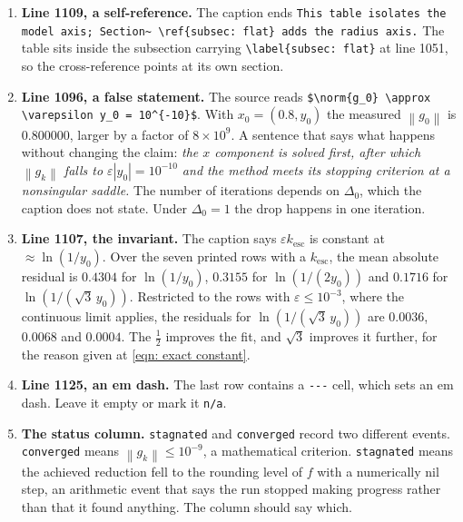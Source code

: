 \documentclass[11pt,a4paper]{article}
\providecommand{\abs}[1]{\left \vert #1 \right \vert}
\providecommand{\norm}[1]{\left \lVert #1 \right \rVert}
\theoremstyle{definition}
\theoremstyle{remark}
\begin{document}
\begin{enumerate}[leftmargin=2em]
  \item \textbf{Line 1109, a self-reference.} The caption ends
        \texttt{This table isolates the model axis; Section\textasciitilde
        \textbackslash ref\{subsec: flat\} adds the radius axis.} The table sits
        inside the subsection carrying \texttt{\textbackslash label\{subsec:
        flat\}} at line 1051, so the cross-reference points at its own section.

  \item \textbf{Line 1096, a false statement.} The source reads
        \texttt{\$\textbackslash norm\{g\_0\} \textbackslash approx
        \textbackslash varepsilon y\_0 = 10\^{}\{-10\}\$}. With
        $x_0 = (0.8, y_0)$ the measured $\norm{g_0}$ is $0.800000$, larger by a
        factor of $8\times10^{9}$. A sentence that says what happens without
        changing the claim: \emph{the $x$ component is solved first, after which
        $\norm{g_k}$ falls to $\varepsilon\abs{y_0} = 10^{-10}$ and the method
        meets its stopping criterion at a nonsingular saddle.} The number of
        iterations depends on $\Delta_0$, which the caption does not state.
        Under $\Delta_0 = 1$ the drop happens in one iteration.

  \item \textbf{Line 1107, the invariant.} The caption says
        $\varepsilon k_{\mathrm{esc}}$ is constant at $\approx \ln(1/y_0)$. Over
        the seven printed rows with a $k_{\mathrm{esc}}$, the mean absolute
        residual is $0.4304$ for $\ln(1/y_0)$, $0.3155$ for $\ln(1/(2y_0))$ and
        $0.1716$ for $\ln(1/(\sqrt3\,y_0))$. Restricted to the rows with
        $\varepsilon \leq 10^{-3}$, where the continuous limit applies, the
        residuals for $\ln(1/(\sqrt3\,y_0))$ are $0.0036$, $0.0068$ and
        $0.0004$. The $\tfrac12$ improves the fit, and $\sqrt3$ improves it
        further, for the reason given at \eqref{eqn: exact constant}.

  \item \textbf{Line 1125, an em dash.} The last row contains a
        \texttt{-{}-{}-} cell, which sets an em dash. Leave it empty or mark it
        \texttt{n/a}.

  \item \textbf{The status column.} \texttt{stagnated} and \texttt{converged}
        record two different events. \texttt{converged} means
        $\norm{g_k} \leq 10^{-9}$, a mathematical criterion.
        \texttt{stagnated} means the achieved reduction fell to the rounding
        level of $f$ with a numerically nil step, an arithmetic event that says
        the run stopped making progress rather than that it found anything. The
        column should say which.
\end{enumerate}
\end{document}
